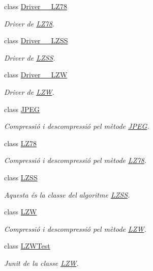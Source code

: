 \begin{DoxyCompactItemize}
class \hyperlink{classdomini_1_1algorithm_1_1Driver____LZ78}{Driver\+\_\+\+\_\+\+L\+Z78}
\begin{DoxyCompactList}\small\item\em Driver de \hyperlink{classdomini_1_1algorithm_1_1LZ78}{L\+Z78}. \end{DoxyCompactList}\item 
class \hyperlink{classdomini_1_1algorithm_1_1Driver____LZSS}{Driver\+\_\+\+\_\+\+L\+Z\+SS}
\begin{DoxyCompactList}\small\item\em Driver de \hyperlink{classdomini_1_1algorithm_1_1LZSS}{L\+Z\+SS}. \end{DoxyCompactList}\item 
class \hyperlink{classdomini_1_1algorithm_1_1Driver____LZW}{Driver\+\_\+\+\_\+\+L\+ZW}
\begin{DoxyCompactList}\small\item\em Driver de \hyperlink{classdomini_1_1algorithm_1_1LZW}{L\+ZW}. \end{DoxyCompactList}\item 
class \hyperlink{classdomini_1_1algorithm_1_1JPEG}{J\+P\+EG}
\begin{DoxyCompactList}\small\item\em Compressió i descompressió pel mètode \hyperlink{classdomini_1_1algorithm_1_1JPEG}{J\+P\+EG}. \end{DoxyCompactList}\item 
class \hyperlink{classdomini_1_1algorithm_1_1LZ78}{L\+Z78}
\begin{DoxyCompactList}\small\item\em Compressió i descompressió pel mètode \hyperlink{classdomini_1_1algorithm_1_1LZ78}{L\+Z78}. \end{DoxyCompactList}\item 
class \hyperlink{classdomini_1_1algorithm_1_1LZSS}{L\+Z\+SS}
\begin{DoxyCompactList}\small\item\em Aquesta és la classe del algoritme \hyperlink{classdomini_1_1algorithm_1_1LZSS}{L\+Z\+SS}. \end{DoxyCompactList}\item 
class \hyperlink{classdomini_1_1algorithm_1_1LZW}{L\+ZW}
\begin{DoxyCompactList}\small\item\em Compressió i descompressió pel mètode \hyperlink{classdomini_1_1algorithm_1_1LZW}{L\+ZW}. \end{DoxyCompactList}\item 
class \hyperlink{classdomini_1_1algorithm_1_1LZWTest}{L\+Z\+W\+Test}
\begin{DoxyCompactList}\small\item\em Junit de la classe \hyperlink{classdomini_1_1algorithm_1_1LZW}{L\+ZW}. \end{DoxyCompactList}\end{DoxyCompactItemize}
